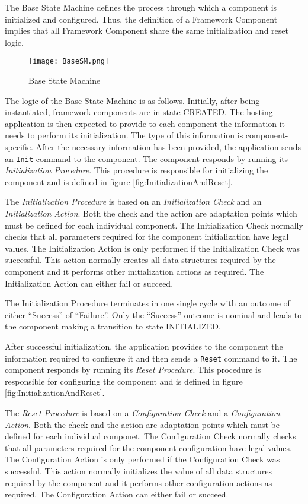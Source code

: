 \documentclass{pnp_article}
\begin{document}
The Base State Machine defines the process through which a component is initialized and configured. Thus, the definition of a Framework Component implies that all Framework Component share the same initialization and reset logic. 

\begin{figure}[h]
 \centering
 \texttt{[image: BaseSM.png]}
 \caption{Base State Machine}
 \label{fig:BaseSM}
\end{figure}

The logic of the Base State Machine is as follows. Initially, after being instantiated, framework components are in state CREATED. The hosting application is then expected to provide to each component the information it needs to perform its initialization. The type of this information is component-specific. After the necessary information has been provided, the application sends an \texttt{Init} command to the component. The component responds by running its \textit{Initialization Procedure}. This procedure is responsible for initializing the component and is defined in figure \ref{fig:InitializationAndReset}. 

The \textit{Initialization Procedure} is based on an \textit{Initialization Check} and an \textit{Initialization Action}. Both the check and the action are adaptation points which must be defined for each individual component. The Initialization Check normally checks that all parameters required for the component initialization have legal values.  The Initialization Action is only performed if the Initialization Check was successful.  This action normally creates all data structures required by the component and it performs other initialization actions as required. The Initialization Action can either fail or succeed.

The Initialization Procedure terminates in one single cycle with an outcome of either “Success” of “Failure”. Only the “Success” outcome is nominal and leads to the component making a transition to state INITIALIZED.

After successful initialization, the application provides to the component the information required to configure it and then sends a \texttt{Reset} command to it. The component responds by running its \textit{Reset Procedure}.  This procedure is responsible for configuring the component and is defined in figure  \ref{fig:InitializationAndReset}.
 
The \textit{Reset Procedure} is based on a \textit{Configuration Check} and a \textit{Configuration Action}. Both the check and the action are adaptation points which must be defined for each individual componet. The Configuration Check normally checks that all parameters required for the component configuration have legal values.  The Configuration Action is only performed if the Configuration Check was successful. This action normally initializes the value of all data structures required by the component and it performs other configuration actions as required. The Configuration Action can either fail or succeed.
\end{document}
